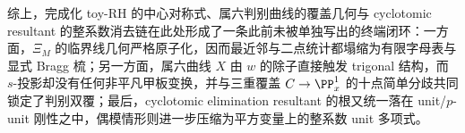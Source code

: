 \noindent
综上，完成化 toy-RH 的中心对称式、属六判别曲线的覆盖几何与 cyclotomic resultant 的整系数消去链在此处形成了一条此前未被单独写出的终端闭环：一方面，\(\Xi_M\) 的临界线几何严格原子化，因而最近邻与二点统计都塌缩为有限字母表与显式 Bragg 梳；另一方面，属六曲线 \(X\) 由 \(w\) 的除子直接触发 trigonal 结构，而 \(s\)-投影却没有任何非平凡甲板变换，并与三重覆盖 \(C\to \PP^1_x\) 的十点简单分歧共同锁定了判别双覆；最后，cyclotomic elimination resultant 的根又统一落在 unit/\(p\)-unit 刚性之中，偶模情形则进一步压缩为平方变量上的整系数 unit 多项式。

\endinput
